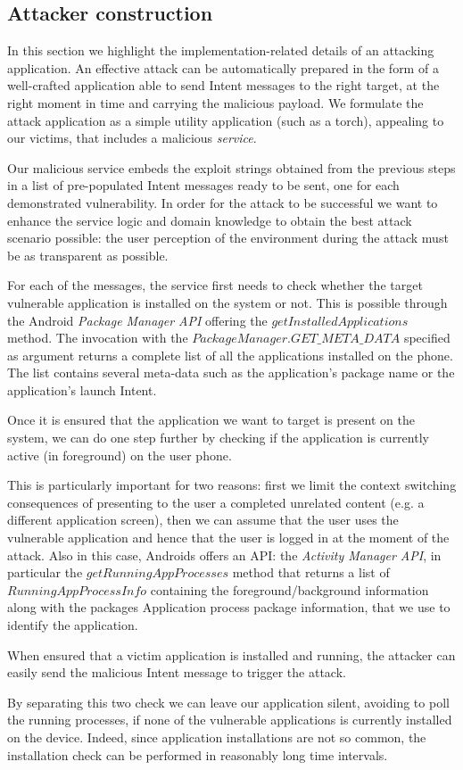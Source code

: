 \subsection{Attacker construction}
In this section we highlight the implementation-related details of an attacking application.
An effective attack can be automatically prepared in the form of a well-crafted application able to send
Intent messages to the right target, at the right moment in time and carrying the malicious payload.
We formulate the attack application as a simple utility application (such as a torch), appealing to our victims,
 that includes a malicious \emph{service}.

Our malicious service embeds the exploit strings obtained from the previous steps in a list of pre-populated
Intent messages ready to be sent, one for each demonstrated vulnerability.
In order for the attack to be successful we want to enhance the service logic and domain knowledge to
obtain the best attack scenario possible: the user perception of the environment during the attack must
be as transparent as possible.

For each of the messages, the service first needs to check whether the target vulnerable application
is installed on the system or not. This is possible through the Android \emph{Package Manager API}\cite{android-package-manager} offering
the $getInstalledApplications$ method. The invocation with the $PackageManager.GET\_META\_DATA$ specified as argument
returns a complete list of all the applications installed on the phone. The list contains several meta-data such as
the application's package name or the application's launch Intent.

Once it is ensured that the application we want to target is present on the system, we can do one step
further by checking if the application is currently active (in foreground) on the user phone.

This is particularly important for two reasons: first we limit the context switching consequences of presenting to the user a completed unrelated content (e.g. a different application screen), then we can assume
that the user uses the vulnerable application and hence that the user is logged in at the moment of the attack.
Also in this case, Androids offers an API: the \emph{Activity Manager API}\cite{android-activity-manager}, in particular the $getRunningAppProcesses$ method that returns a list of $RunningAppProcessInfo$ containing the foreground/background information along with the packages Application process package information, that we
use to identify the application.

When ensured that a victim application is installed and running, the attacker can easily send the malicious Intent message to trigger the attack.

By separating this two check we can leave our application silent, avoiding to poll the running processes,
if none of the vulnerable applications is currently installed on the device. Indeed, since application
installations are not so common, the installation check can be performed in reasonably long time intervals.
